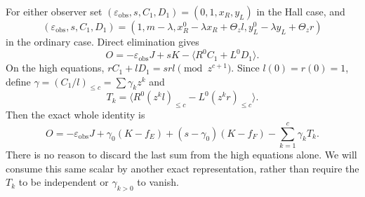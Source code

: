 \documentclass[11pt,a4paper]{amsart}
\numberwithin{equation}{section}
\theoremstyle{plain}
\theoremstyle{definition}
\newcommand{\eps}{\varepsilon}
\begin{document}
For either observer set \((\eps_{\mathrm{obs}},s,C_1,D_1)=(0,1,x_R,y_L)\) in the Hall case, and
\[
 (\eps_{\mathrm{obs}},s,C_1,D_1)=
 (1,m-\lambda,x_R^0-\lambda x_R+\Theta_z l,
                  y_L^0-\lambda y_L+\Theta_z r)
\]
in the ordinary case.  Direct elimination gives
\[
 O=-\eps_{\mathrm{obs}} J+sK-\langle R^0C_1+L^0D_1\rangle.
\]
On the high equations, \(rC_1+lD_1=srl\pmod{z^{c+1}}\).  Since \(l(0)=r(0)=1\), define \(\gamma=(C_1/l)_{\le c}=\sum\gamma_kz^k\) and
\[
 T_k=\langle R^0(z^kl)_{\le c}-L^0(z^kr)_{\le c}\rangle.
\]
Then the exact whole identity is
\begin{equation}\label{eq:gamma-functional}
 O=-\eps_{\mathrm{obs}} J+\gamma_0(K-f_E)+(s-\gamma_0)(K-f_F)
                   -\sum_{k=1}^c\gamma_kT_k.
\end{equation}
There is no reason to discard the last sum from the high equations alone.  We will consume this same scalar by another exact representation, rather than require the \(T_k\) to be independent or \(\gamma_{k>0}\) to vanish.
\end{document}
